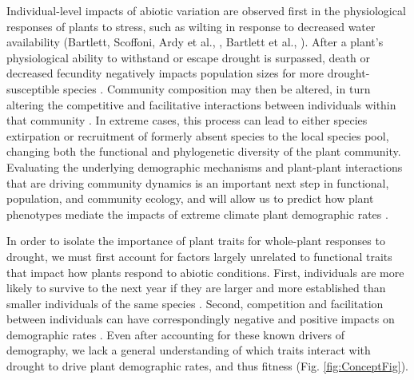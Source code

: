 \documentclass[12pt, letterpaper]{article}
\begin{document}
Individual-level impacts of abiotic variation are observed first in the physiological responses of plants to stress, such as wilting in response to decreased water availability (Bartlett, Scoffoni, Ardy et al., , Bartlett et al., \citeyear{Bartlett2016TheDrought}). After a plant’s physiological ability to withstand or escape drought is surpassed, death or decreased fecundity negatively impacts population sizes for more drought-susceptible species \cite{Koerner2014}. Community composition may then be altered, in turn altering the competitive and facilitative interactions between individuals within that community \cite{Ploughe2019CommunityInteractions, Harrison2015Climate-drivenCommunity}. In extreme cases, this process can lead to either species extirpation or recruitment of formerly absent species to the local species pool, changing both the functional and phylogenetic diversity of the plant community. Evaluating the underlying demographic mechanisms and plant-plant interactions that are driving community dynamics is an important next step in functional, population, and community ecology, and will allow us to predict how plant phenotypes mediate the impacts of extreme climate plant demographic rates .

In order to isolate the importance of plant traits for whole-plant responses to drought, we must first account for factors largely unrelated to functional traits that impact how plants respond to abiotic conditions. First, individuals are more likely to survive to the next year if they are larger and more established than smaller individuals of the same species . Second, competition and facilitation between individuals can have correspondingly negative and positive impacts on demographic rates . Even after accounting for these known drivers of demography, we lack a general understanding of which traits interact with drought to drive plant demographic rates, and thus fitness (Fig. \ref{fig:ConceptFig}).  
\end{document}
